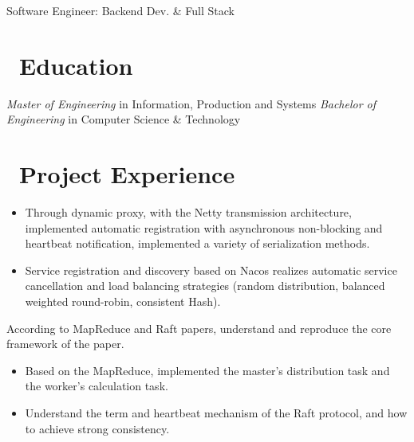 \documentclass{resume}
\begin{document}


\centerline{Software Engineer: Backend Dev. \& Full Stack}
\vspace{2ex}

 
\section{\faGraduationCap\ Education}
\textit{Master of Engineering} in Information, Production and Systems
\textit{Bachelor of Engineering} in Computer Science \& Technology

\section{\faUsers\ Project Experience}
\begin{itemize}
  \item Through dynamic proxy, with the Netty transmission architecture, implemented automatic registration with asynchronous non-blocking and heartbeat notification, implemented a variety of serialization methods.
  \item Service registration and discovery based on Nacos realizes automatic service cancellation and load balancing strategies (random distribution, balanced weighted round-robin, consistent Hash).
\end{itemize}

According to MapReduce and Raft papers, understand and reproduce the core framework of the paper.
\begin{itemize}
  \item Based on the MapReduce, implemented the master's distribution task and the worker's calculation task.
  \item Understand the term and heartbeat mechanism of the Raft protocol, and how to achieve strong consistency.
\end{itemize}
\end{document}
